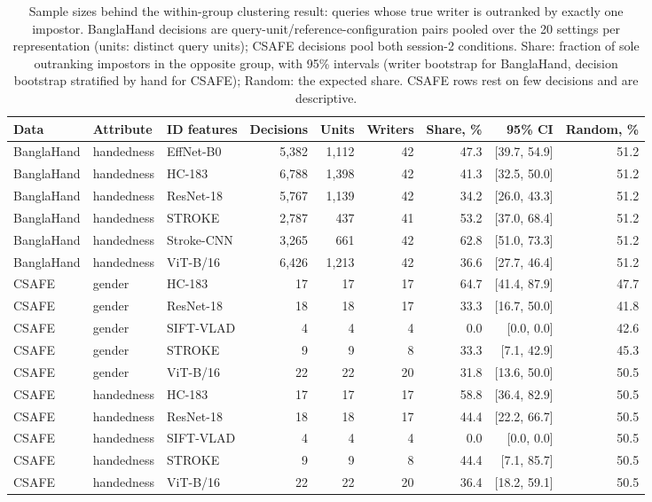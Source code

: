 \documentclass[10pt,a4paper]{article}
\begin{document}
\begin{table}[ht]
\caption{Sample sizes behind the within-group clustering result: queries whose true writer is outranked by exactly one impostor. BanglaHand decisions are query-unit/reference-configuration pairs pooled over the 20 settings per representation (units: distinct query units); CSAFE decisions pool both session-2 conditions. Share: fraction of sole outranking impostors in the opposite group, with 95\% intervals (writer bootstrap for BanglaHand, decision bootstrap stratified by hand for CSAFE); Random: the expected share. CSAFE rows rest on few decisions and are descriptive.}\label{tab:counts}
\centering\footnotesize\setlength{\tabcolsep}{3.5pt}
\begin{tabular}{lllrrrrrr}\toprule
Data & Attribute & ID features & Decisions & Units & Writers & Share, \% & 95\% CI & Random, \%\\\midrule
BanglaHand & handedness & EffNet-B0 & 5,382 & 1,112 & 42 & 47.3 & [39.7, 54.9] & 51.2 \\
BanglaHand & handedness & HC-183 & 6,788 & 1,398 & 42 & 41.3 & [32.5, 50.0] & 51.2 \\
BanglaHand & handedness & ResNet-18 & 5,767 & 1,139 & 42 & 34.2 & [26.0, 43.3] & 51.2 \\
BanglaHand & handedness & STROKE & 2,787 & 437 & 41 & 53.2 & [37.0, 68.4] & 51.2 \\
BanglaHand & handedness & Stroke-CNN & 3,265 & 661 & 42 & 62.8 & [51.0, 73.3] & 51.2 \\
BanglaHand & handedness & ViT-B/16 & 6,426 & 1,213 & 42 & 36.6 & [27.7, 46.4] & 51.2 \\
\midrule
CSAFE & gender & HC-183 & 17 & 17 & 17 & 64.7 & [41.4, 87.9] & 47.7 \\
CSAFE & gender & ResNet-18 & 18 & 18 & 17 & 33.3 & [16.7, 50.0] & 41.8 \\
CSAFE & gender & SIFT-VLAD & 4 & 4 & 4 & 0.0 & [0.0, 0.0] & 42.6 \\
CSAFE & gender & STROKE & 9 & 9 & 8 & 33.3 & [7.1, 42.9] & 45.3 \\
CSAFE & gender & ViT-B/16 & 22 & 22 & 20 & 31.8 & [13.6, 50.0] & 50.5 \\
\midrule
CSAFE & handedness & HC-183 & 17 & 17 & 17 & 58.8 & [36.4, 82.9] & 50.5 \\
CSAFE & handedness & ResNet-18 & 18 & 18 & 17 & 44.4 & [22.2, 66.7] & 50.5 \\
CSAFE & handedness & SIFT-VLAD & 4 & 4 & 4 & 0.0 & [0.0, 0.0] & 50.5 \\
CSAFE & handedness & STROKE & 9 & 9 & 8 & 44.4 & [7.1, 85.7] & 50.5 \\
CSAFE & handedness & ViT-B/16 & 22 & 22 & 20 & 36.4 & [18.2, 59.1] & 50.5 \\
\bottomrule
\end{tabular}
\end{table}
\end{document}
